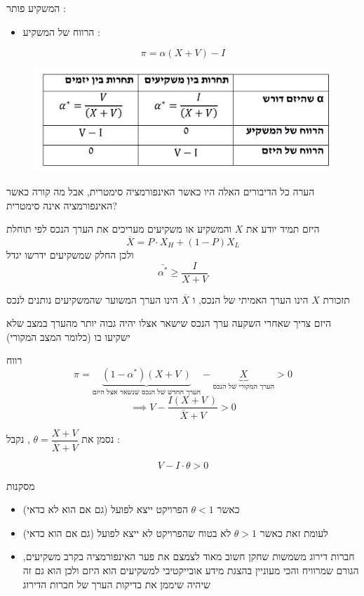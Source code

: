\documentclass[usenames,dvipsnames]{beamer}
\begin{document}
\begin{RTL}
\begin{frame}[allowframebreaks]
    המשקיע פותר : \\
    \begin{itemize}
        \item  הרווח של המשקיע :
    \end{itemize}
    $$\pi = \alpha(X+V) - I$$
    \begin{figure}
        \centering
        \includegraphics[width=\textwidth]{images/Screenshot 2023-12-03 at 19.35.55.png}
    \end{figure}

    \framebreak
    \begin{alertblock}{הערה}
    כל הדיבורים האלה היו כאשר האינפורמציה סימטרית, אבל מה קורה כאשר האינפורמציה אינה סימטרית?
        
    \end{alertblock}
   היזם תמיד יודע את $X$ והמשקיע או משקיעים מעריכים את הערך הנכס לפי תוחלת
   $$\overline X = P \cdot X_H + \left(1-P\right) X_L $$
   ולכן החלק שמשקיעים ידרשו יגדל
    $$\bar{\alpha^*} \geq \frac{I}{X+V}$$

    \begin{alertblock}{תזכורת}
        $X$ הינו הערך האמיתי של הנכס, ו $\overline X$ הינו הערך המשוער שהמשקיעים נותנים לנכס
    \end{alertblock}
    \framebreak
    היזם צריך שאחרי השקעה ערך הנכס שישאר אצלו יהיה גבוה יותר מהערך במצב שלא ישקיעו בו (כלומר המצב המקורי)
    \begin{block}{רווח}
        $$\pi = \underbrace{(1-\alpha^*)\left(X +V \ \right)}_{\text{הערך החדש של הנכס שנשאר אצל היזם}} - \underbrace{X}_{\text{הערך המקורי של הנכס}} > 0 $$
        $$ \implies V - \frac{I \left(X + V \ \right)}{\bar X + V} > 0$$

        נסמן את $\theta = \dfrac{X+V}{\overline{X} + V}$ , נקבל :

        $$ V - I \cdot \theta > 0$$ 
    \end{block}
    \framebreak
    \begin{exampleblock}{מסקנות}
    \begin{itemize}
        \item כאשר $\theta < 1$ הפרויקט ייצא לפועל  (גם אם הוא לא כדאי) 
        \item לעומת זאת כאשר $\theta > 1$  לא בטוח שהפרויקט לא ייצא לפועל (גם אם הוא כדאי)
        \item חברות דירוג משמשות שחקן חשוב מאוד לצמצם את פער האינפורמציה בקרב משקיעים, הגורם שמרוויח והכי מעוניין בהצגת מידע אובייקטיבי למשקיעים הוא היזם ולכן הוא גם זה שיהיה שיממן את בדיקות הערך של חברות הדירוג
    \end{itemize}

	
\end{exampleblock}
\end{frame}
\end{RTL}
\end{document}
